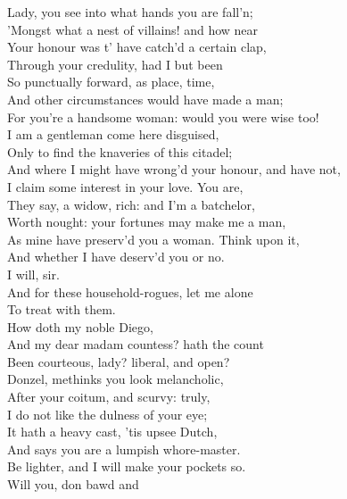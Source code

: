 \documentclass{memoir}
\begin{document}
\begin{drama*}
\surlyspeaks  Lady, you see into what hands you are fall'n;\\
 'Mongst what a nest of villains! and how near\\
 Your honour was t' have catch'd a certain clap,\\
 Through your credulity, had I but been\\
 So punctually forward, as place, time,\\
 And other circumstances would have made a man;\\
 For you're a handsome woman: would you were wise too!\\
 I am a gentleman come here disguised,\\
 Only to find the knaveries of this citadel;\\
 And where I might have wrong'd your honour, and have not,\\
 I claim some interest in your love. You are,\\
 They say, a widow, rich: and I'm a batchelor,\\
 Worth nought: your fortunes may make me a man,\\
 As mine have preserv'd you a woman. Think upon it,\\
 And whether I have deserv'd you or no.\\
\pliantspeaks  I will, sir.\\
\surlyspeaks {} And for these household-rogues, let me alone\\
 To treat with them.\\
\subtlespeaks {} How doth my noble Diego,\\
 And my dear madam countess? hath the count\\
 Been courteous, lady? liberal, and open?\\
 Donzel, methinks you look melancholic,\\
 After your coitum, and scurvy: truly,\\
 I do not like the dulness of your eye;\\
 It hath a heavy cast, 'tis upsee Dutch,\\
 And says you are a lumpish whore-master.\\
 Be lighter, and I will make your pockets so.\\
\surlyspeaks {} Will you, don bawd and\\

\end{drama*}
\end{document}
